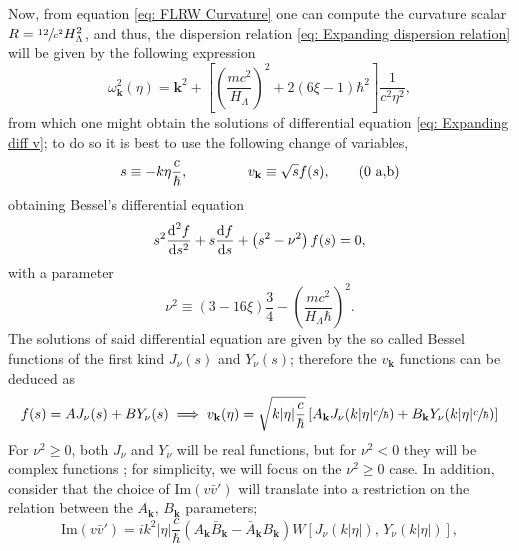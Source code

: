 Now, from equation \ref{eq: FLRW Curvature} one can compute the curvature scalar $R=\sfrac{12}{c^2}H_\Lambda^2$, and thus, the dispersion relation \ref{eq: Expanding dispersion relation} will be given by the following expression
\begin{equation}\label{eq: de Sitter dispersion relation}
	\omega^2_\mathbf{k}(\eta)=\mathbf{k}^2+\left[\left(\frac{mc^2}{H_\Lambda}\right)^2+2\left(6\xi-1\right)\hbar^2\right]\frac{1}{c^2\eta^2},
\end{equation}
from which one might obtain the solutions of differential equation \ref{eq: Expanding diff v}; to do so it is best to use the following change of variables,
\begin{subequations}
	\begin{gather}
		s\equiv -k\eta\frac{c}{\hbar},\hspace{1.5cm}v_\mathbf{k}\equiv \sqrt{s}f(s),\tag{\theequation \,\,a,b}
	\end{gather}
\end{subequations}
obtaining Bessel's differential equation
\begin{equation}
	s^2\frac{\text{d}^2f}{\text{d} s^2}+s\frac{\text{d} f}{\text{d} s}+\left(s^2-\nu^2\right)f(s)=0,
\end{equation}
with a parameter
\begin{equation}
	\nu^2\equiv \left(3-16\xi\right)\frac{3}{4}-\left(\frac{mc^2}{H_\Lambda\hbar }\right)^2.
\end{equation}
The solutions of said differential equation are given by the so called Bessel functions of the first kind $J_\nu(s)$ and $Y_\nu(s)$; therefore the $v_\mathbf{k}$ functions can be deduced as
\begin{equation}\label{eq: de Sitter general v}
	f(s)=AJ_\nu(s)+BY_\nu(s)\implies v_\mathbf{k}(\eta)=\sqrt{k|\eta|\frac{c}{\hbar}}\left[A_\mathbf{k}J_\nu(k|\eta|\sfrac{c}{\hbar})+B_\mathbf{k}Y_\nu(k|\eta|\sfrac{c}{\hbar})\right]
\end{equation}
For $\nu^2\geq 0$, both $J_\nu$ and $Y_\nu$ will be real functions, but for $\nu^2<0$ they will be complex functions \cite{BesselComplex}; for simplicity, we will focus on the $\nu^2\geq 0$ case. In addition, consider that the choice of $\text{Im}(v\bar v')$ will translate into a restriction on the relation between the  $A_\mathbf{k},\,B_\mathbf{k}$ parameters;
\begin{equation}
	\text{Im}\left(v\bar{v}'\right)=ik^2|\eta|\frac{c}{\hbar}\left(A_\mathbf{k}\bar{B}_\mathbf{k}-\bar{A}_\mathbf{k}B_\mathbf{k}\right)W\left[J_\nu\left(k|\eta|\right),\,Y_\nu\left(k|\eta|\right)\right],
\end{equation}
